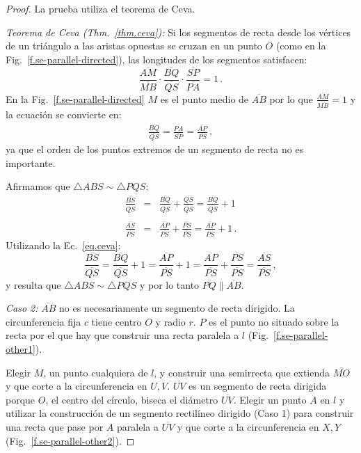{\begin{proof}
La prueba utiliza el teorema de Ceva.

\textit{Teorema de Ceva  (Thm.~\ref{thm.ceva}):}
Si los segmentos de recta desde los vértices de un triángulo a las aristas opuestas se cruzan en un punto $O$ (como en la Fig.~\ref{f.se-parallel-directed}), las longitudes de los segmentos satisfacen:
\[
\frac{\overline{AM}}{\overline{MB}}\cdot\frac{\overline{BQ}}{\overline{QS}}\cdot\frac{\overline{SP}}{\overline{PA}} = 1\,.
\]
En la Fig.~\ref{f.se-parallel-directed} $M$ es el punto medio de $\overline{AB}$ por lo que $\displaystyle\frac{\overline{AM}}{\overline{MB}}=1$ y la ecuación se convierte en:
\begin{align}
\frac{\overline{BQ}}{\overline{QS}}=\frac{\overline{PA}}{\overline{SP}}=\frac{\overline{AP}}{\overline{PS}}\,,\label{eq.ceva}
\end{align}
ya que el orden de los puntos extremos de un segmento de recta no es importante.

Afirmamos que $\triangle ABS \sim \triangle PQS$:
\begin{eqnarray*}
\frac{\overline{BS}}{\overline{QS}}&=&\frac{\overline{BQ}}{\overline{QS}}+\frac{\overline{QS}}{\overline{QS}} = \frac{\overline{BQ}}{\overline{QS}}+1\\
&&\\
\frac{\overline{AS}}{\overline{PS}} &=& \frac{\overline{AP}}{\overline{PS}} + \frac{\overline{PS}}{\overline{PS}} = \frac{\overline{AP}}{\overline{PS}} + 1\,.
\end{eqnarray*}
Utilizando la Ec.~\ref{eq.ceva}:
\[
\frac{\overline{BS}}{\overline{QS}}=\frac{\overline{BQ}}{\overline{QS}}+1=\frac{\overline{AP}}{\overline{PS}}+1=\frac{\overline{AP}}{\overline{PS}}+\frac{\overline{PS}}{\overline{PS}}=\frac{\overline{AS}}{\overline{PS}}\,,
\]
y resulta que $\triangle ABS \sim \triangle PQS$ y por lo tanto $\overline{PQ}\parallel\overline{AB}$.

\textit{Caso 2:}
$\overline{AB}$ no es necesariamente un segmento de recta dirigido. La circunferencia fija $c$ tiene centro $O$ y radio $r$. $P$ es el punto no situado sobre la recta por el que hay que construir una recta paralela a $l$ (Fig.~\ref{f.se-parallel-other1}).

Elegir $M$, un punto cualquiera de $l$, y construir una semirrecta que extienda $\overline{MO}$ y que corte a la circunferencia en $U,V$.
$\overline{UV}$ es un segmento de recta dirigida porque $O$, el centro del círculo, biseca el diámetro $\overline{UV}$. Elegir un punto $A$ en $l$ y utilizar la construcción de un segmento rectilíneo dirigido (Caso 1) para construir una recta que pase por $A$ paralela a $\overline{UV}$ y que corte a la circunferencia en $X,Y$ (Fig.~\ref{f.se-parallel-other2}).


\end{proof}}
